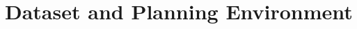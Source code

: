 \documentclass{article} %
\begin{document}

\section{Dataset and Planning Environment}
\label{dataset-and-planning}
\end{document}
